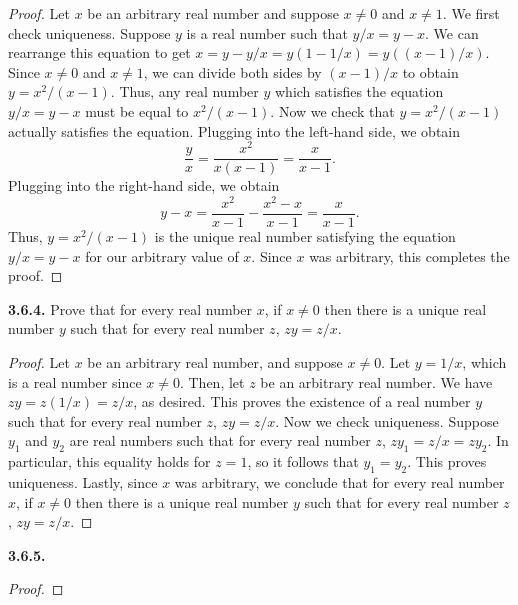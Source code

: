 \documentclass[12pt]{amsart}
\newenvironment{statement}[1]{\smallskip\noindent\color[rgb]{.6627, .3529, .6314} {\bf #1.}}{}
\theoremstyle{definition}
\theoremstyle{remark}
\begin{document}
\begin{proof}
Let $x$ be an arbitrary real number and suppose $x \neq 0$ and $x \neq 1$.
We first check uniqueness.
Suppose $y$ is a real number such that $y/x = y - x$.
We can rearrange this equation to get $x = y - y/x = y (1 - 1/x) = y((x - 1)/x)$.
Since $x  \neq 0$ and $x \neq 1$, we can divide both sides by $(x - 1)/x$ to obtain $y = x^2/(x - 1)$.
Thus, any real number $y$ which satisfies the equation $y/x = y - x$ must be equal to $x^2/(x - 1)$.
Now we check that $y = x^2/(x - 1)$ actually satisfies the equation.
Plugging into the left-hand side, we obtain
\begin{equation*}
	\frac{y}{x} = \frac{x^2}{x(x - 1)} = \frac{x}{x - 1}.
\end{equation*}
Plugging into the right-hand side, we obtain
\begin{equation*}
	y - x = \frac{x^2}{x - 1} - \frac{x^2 - x}{x - 1} = \frac{x}{x - 1}.
\end{equation*}
Thus, $y = x^2/(x - 1)$ is the unique real number satisfying the equation $y/x = y - x$ for our arbitrary value of $x$.
Since $x$ was arbitrary, this completes the proof.
\end{proof}


\begin{statement}{3.6.4}
Prove that for every real number $x$, if $x \neq 0$ then there is a unique real number $y$ such that for every real number $z$, $zy = z/x$.
\end{statement}

\begin{proof}
Let $x$ be an arbitrary real number, and suppose $x \neq 0$.
Let $y = 1/x$, which is a real number since $x \neq 0$.
Then, let $z$ be an arbitrary real number.
We have $zy = z(1/x) = z/x$, as desired.
This proves the existence of a real number $y$ such that for every real number $z$, $zy = z/x$.
Now we check uniqueness.
Suppose $y_1$ and $y_2$ are real numbers such that for every real number $z$, $zy_1 = z/x = zy_2$.
In particular, this equality holds for $z = 1$, so it follows that $y_1 = y_2$.
This proves uniqueness.
Lastly, since $x$ was arbitrary, we conclude that for every real number $x$, if $x \neq 0$ then there is a unique real number $y$ such that for every real number $z$, $zy = z/x$.
\end{proof}


\begin{statement}{3.6.5}
\end{statement}

\begin{proof}
\end{proof}
\end{document}

